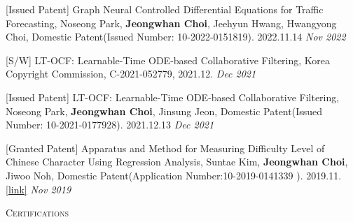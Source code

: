 \documentclass[10pt]{article}
\newenvironment{changemargin}[2]{
  \begin{list}{}{
    \setlength{\topsep}{0pt}
    \setlength{\leftmargin}{#1}
    \setlength{\rightmargin}{#2}
    \setlength{\listparindent}{\parindent}
    \setlength{\itemindent}{\parindent}
    \setlength{\parsep}{\parskip}
  }
  \item[]}{\end{list}
}
\newcommand{\lineover}{
	\begin{changemargin}{-0.05in}{-0.05in}
		\vspace*{-8pt}
		\hrulefill \\
		\vspace*{-2pt}
	\end{changemargin}
}
\newcommand{\header}[1]{
	\begin{changemargin}{-0.5in}{-0.5in}
		\scshape{#1}\\
  	\lineover
	\end{changemargin}
}
\newcommand{\presentation}[2]{
	{#1} \hfill \emph{#2}\\ \bigskip
}
\newenvironment{body} {
	\vspace*{-16pt}
	\begin{changemargin}{-0.25in}{-0.5in}
  }
	{\end{changemargin}
}
\begin{document}
\begin{body}
	\vspace{14pt}
	
\presentation{[Issued Patent] Graph Neural Controlled Differential Equations for Traffic Forecasting, Noseong Park, \textbf{Jeongwhan Choi}, Jeehyun Hwang, Hwangyong Choi, Domestic Patent(Issued Number: 10-2022-0151819). 2022.11.14}{Nov 2022}	
\presentation{[S/W] LT-OCF: Learnable-Time ODE-based Collaborative Filtering, Korea Copyright Commission, C-2021-052779, 2021.12.}{Dec 2021}	
\presentation{[Issued Patent] LT-OCF: Learnable-Time ODE-based Collaborative Filtering, Noseong Park, \textbf{Jeongwhan Choi}, Jinsung Jeon, Domestic Patent(Issued Number: 10-2021-0177928). 2021.12.13}{Dec 2021}	
\presentation{[Granted Patent] Apparatus and Method for Measuring Difficulty Level of Chinese Character Using Regression Analysis, Suntae Kim, \textbf{Jeongwhan Choi}, Jiwoo Noh, Domestic Patent(Application Number:10-2019-0141339 ). 2019.11. \href{https://doi.org/10.8080/1020190141339}{[link]}}{Nov 2019}	
  
\end{body}
    
\medskip


\header{Certifications}
\end{document}
